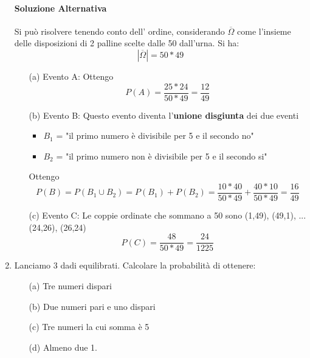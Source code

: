 \documentclass{report}
\begin{document}
\begin{enumerate}
    \paragraph{Soluzione Alternativa} Si può risolvere tenendo conto dell' ordine, considerando \(\overline{\Omega}\) come l'insieme delle disposizioni di 2 palline scelte dalle 50 dall'urna. Si ha: \[|\overline{\Omega}| = 50*49\]
    \begin{itemize}
        \item [(a)] Evento A: Ottengo \[P(A) = \frac{25*24}{50*49} = \frac{12}{49}\]
        \item [(b)] Evento B: Questo evento diventa l'\textbf{unione disgiunta} dei due eventi \begin{itemize}
            \item \(B_1\) = "il primo numero è divisibile per 5 e il secondo no"
            \item \(B_2\) = "il primo numero non è divisibile per 5 e il secondo si"
        \end{itemize}
        Ottengo \[P(B) = P(B_1 \cup B_2) = P(B_1) + P(B_2) = \frac{10*40}{50*49} + \frac{40*10}{50*49} = \frac{16}{49}\] 
        \item [(c)] Evento C: Le coppie ordinate che sommano a 50 sono (1,49), (49,1), ... (24,26), (26,24) \[P(C) = \frac{48}{50*49} = \frac{24}{1225}\]
    \end{itemize}
    \item Lanciamo 3 dadi equilibrati. Calcolare la probabilità di ottenere:
    \begin{itemize}
        \item [(a)] Tre numeri dispari
        \item [(b)] Due numeri pari e uno dispari
        \item [(c)] Tre numeri la cui somma è 5
        \item [(d)] Almeno due 1.
    \end{itemize}

\end{enumerate}
\end{document}
